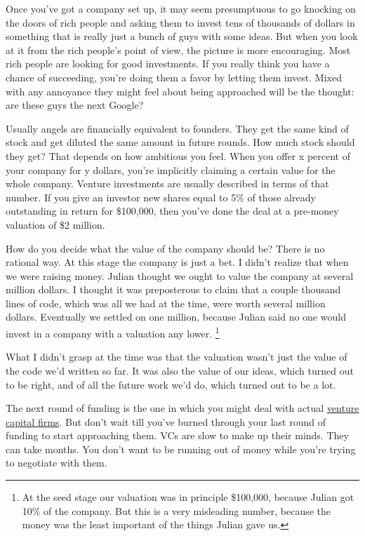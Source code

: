 \documentclass[12pt]{book}
\begin{document}
Once you've got a company set up, it may seem presumptuous to go
knocking on the doors of rich people and asking them to invest tens of
thousands of dollars in something that is really just a bunch of guys
with some ideas. But when you look at it from the rich people's point of
view, the picture is more encouraging. Most rich people are looking for
good investments. If you really think you have a chance of succeeding,
you're doing them a favor by letting them invest. Mixed with any
annoyance they might feel about being approached will be the thought:
are these guys the next Google?

Usually angels are financially equivalent to founders. They get the same
kind of stock and get diluted the same amount in future rounds. How much
stock should they get? That depends on how ambitious you feel. When you
offer x percent of your company for y dollars, you're implicitly
claiming a certain value for the whole company. Venture investments are
usually described in terms of that number. If you give an investor new
shares equal to 5\% of those already outstanding in return for
\$100,000, then you've done the deal at a pre-money valuation of \$2
million.

How do you decide what the value of the company should be? There is no
rational way. At this stage the company is just a bet. I didn't realize
that when we were raising money. Julian thought we ought to value the
company at several million dollars. I thought it was preposterous to
claim that a couple thousand lines of code, which was all we had at the
time, were worth several million dollars. Eventually we settled on one
million, because Julian said no one would invest in a company with a
valuation any lower. \footnote{At the seed stage our valuation was in principle \$100,000,
because Julian got 10\% of the company. But this is a very misleading
number, because the money was the least important of the things Julian
gave us.}

What I didn't grasp at the time was that the valuation wasn't just the
value of the code we'd written so far. It was also the value of our
ideas, which turned out to be right, and of all the future work we'd do,
which turned out to be a lot.

The next round of funding is the one in which you might deal with actual
\href{venturecapital.html}{venture capital firms}. But don't wait till
you've burned through your last round of funding to start approaching
them. VCs are slow to make up their minds. They can take months. You
don't want to be running out of money while you're trying to negotiate
with them.
\end{document}
